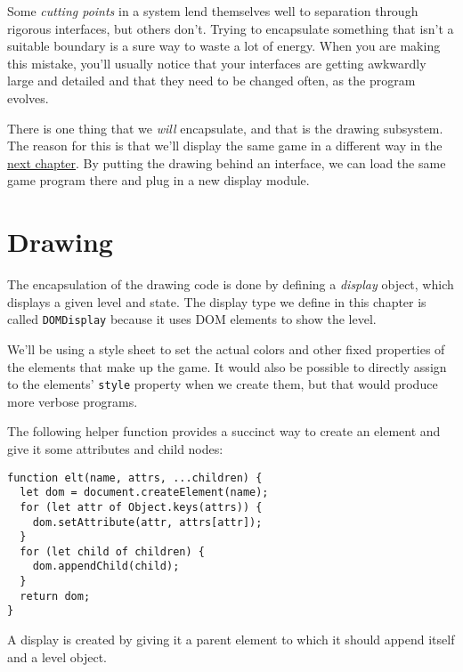 Some \emph{cutting points} in a system lend themselves well to separation through rigorous interfaces, but others don't. Trying to encapsulate something that isn't a suitable boundary is a sure way to waste a lot of energy. When you are making this mistake, you'll usually notice that your interfaces are getting awkwardly large and detailed and that they need to be changed often, as the program evolves.

There is one thing that we \emph{will} encapsulate, and that is the drawing subsystem. The reason for this is that we'll display the same game in a different way in the \hyperref[canvas.canvasdisplay]{next chapter}. By putting the drawing behind an interface, we can load the same game program there and plug in a new display module.

\label{game.domdisplay}\section{Drawing}

The encapsulation of the drawing code is done by defining a \emph{display} object, which displays a given level and state. The display type we define in this chapter is called \lstinline`DOMDisplay` because it uses DOM elements to show the level.

We'll be using a style sheet to set the actual colors and other fixed properties of the elements that make up the game. It would also be possible to directly assign to the elements' \lstinline`style` property when we create them, but that would produce more verbose programs.

The following helper function provides a succinct way to create an element and give it some attributes and child nodes:

\begin{lstlisting}
function elt(name, attrs, ...children) {
  let dom = document.createElement(name);
  for (let attr of Object.keys(attrs)) {
    dom.setAttribute(attr, attrs[attr]);
  }
  for (let child of children) {
    dom.appendChild(child);
  }
  return dom;
}
\end{lstlisting}
\noindent

A display is created by giving it a parent element to which it should append itself and a level object.

